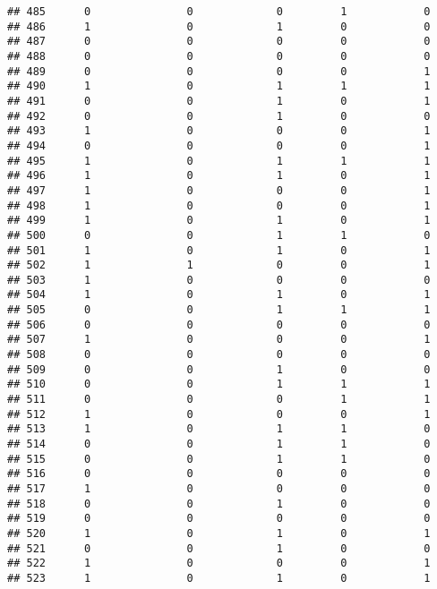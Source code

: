\documentclass[]{article}
\begin{document}
\begin{verbatim}
## 485      0               0             0         1            0
## 486      1               0             1         0            0
## 487      0               0             0         0            0
## 488      0               0             0         0            0
## 489      0               0             0         0            1
## 490      1               0             1         1            1
## 491      0               0             1         0            1
## 492      0               0             1         0            0
## 493      1               0             0         0            1
## 494      0               0             0         0            1
## 495      1               0             1         1            1
## 496      1               0             1         0            1
## 497      1               0             0         0            1
## 498      1               0             0         0            1
## 499      1               0             1         0            1
## 500      0               0             1         1            0
## 501      1               0             1         0            1
## 502      1               1             0         0            1
## 503      1               0             0         0            0
## 504      1               0             1         0            1
## 505      0               0             1         1            1
## 506      0               0             0         0            0
## 507      1               0             0         0            1
## 508      0               0             0         0            0
## 509      0               0             1         0            0
## 510      0               0             1         1            1
## 511      0               0             0         1            1
## 512      1               0             0         0            1
## 513      1               0             1         1            0
## 514      0               0             1         1            0
## 515      0               0             1         1            0
## 516      0               0             0         0            0
## 517      1               0             0         0            0
## 518      0               0             1         0            0
## 519      0               0             0         0            0
## 520      1               0             1         0            1
## 521      0               0             1         0            0
## 522      1               0             0         0            1
## 523      1               0             1         0            1

\end{verbatim}
\end{document}
